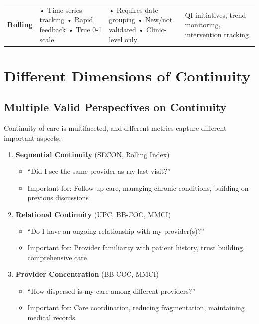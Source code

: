 \documentclass[11pt,a4paper]{article}
\begin{document}
\begin{longtable}{p{2cm}p{5cm}p{5cm}p{4cm}}
\textbf{Rolling} & 
• Time-series tracking\newline
• Rapid feedback\newline
• True 0-1 scale & 
• Requires date grouping\newline
• New/not validated\newline
• Clinic-level only & 
QI initiatives, trend monitoring, intervention tracking \\
\end{longtable}

\section{Different Dimensions of Continuity}

\subsection{Multiple Valid Perspectives on Continuity}

Continuity of care is multifaceted, and different metrics capture different important aspects:

\begin{enumerate}
\item \textbf{Sequential Continuity} (SECON, Rolling Index)
\begin{itemize}
\item ``Did I see the same provider as my last visit?''
\item Important for: Follow-up care, managing chronic conditions, building on previous discussions
\end{itemize}

\item \textbf{Relational Continuity} (UPC, BB-COC, MMCI)
\begin{itemize}
\item ``Do I have an ongoing relationship with my provider(s)?''
\item Important for: Provider familiarity with patient history, trust building, comprehensive care
\end{itemize}

\item \textbf{Provider Concentration} (BB-COC, MMCI)
\begin{itemize}
\item ``How dispersed is my care among different providers?''
\item Important for: Care coordination, reducing fragmentation, maintaining medical records
\end{itemize}
\end{enumerate}
\end{document}
